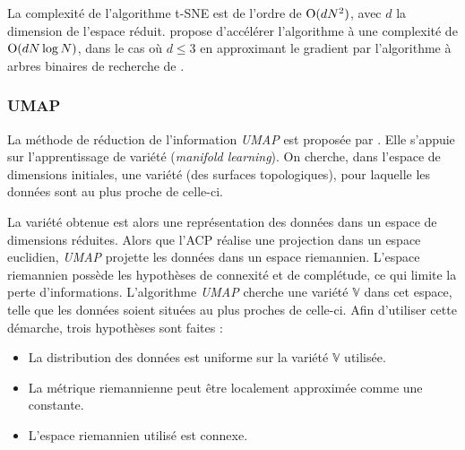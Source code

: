 La complexité de l'algorithme t-SNE est de l'ordre de $\operatorname{O}(d N^2)$, avec $d$ la dimension de l'espace réduit.
\cite{maaten_accelerating_2014} propose d'accélérer l'algorithme à une complexité de $\operatorname{O}(d N \log N)$, dans le cas où $d \le 3$ en approximant le gradient par l'algorithme à arbres binaires de recherche de \citeauthor{barnes_hierarchical_1986} \cite{barnes_hierarchical_1986}.

\subsubsection{UMAP} \label{subsubsec:umap}
La méthode de réduction de l'information \textit{UMAP} est proposée par \citeauthor{mcinnes_umap_2018} \cite{mcinnes_umap_2018, mcinnes_umap_2018a}.
Elle s'appuie sur l'apprentissage de variété (\textit{manifold learning}).
On cherche, dans l'espace de dimensions initiales, une variété (des surfaces topologiques), pour laquelle les données sont au plus proche de celle-ci.

La variété obtenue est alors une représentation des données dans un espace de dimensions réduites.
Alors que l'ACP réalise une projection dans un espace euclidien, \textit{UMAP} projette les données dans un espace riemannien.
L'espace riemannien possède les hypothèses de connexité et de complétude, ce qui limite la perte d'informations.
L'algorithme \textit{UMAP} cherche une variété $\mathbb{V}$ dans cet espace, telle que les données soient situées au plus proches de celle-ci.
Afin d'utiliser cette démarche, trois hypothèses sont faites :
\begin{itemize}
\item La distribution des données est uniforme sur la variété $\mathbb{V}$ utilisée.
\item La métrique riemannienne peut être localement approximée comme une constante.
\item L'espace riemannien utilisé est connexe.
\end{itemize}

